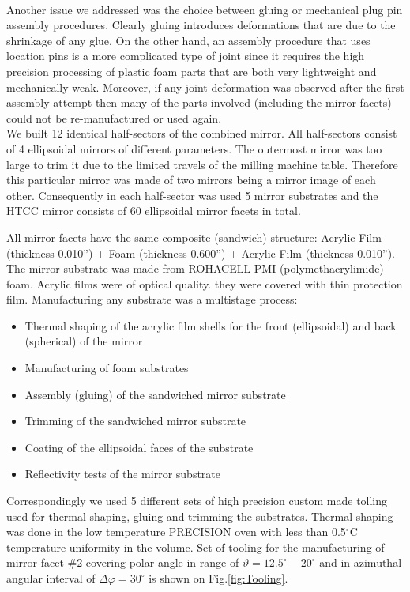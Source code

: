 \\
\indent Another issue we addressed was the choice between gluing or mechanical plug pin assembly procedures. Clearly gluing introduces deformations that are due to the shrinkage of any glue. On the other hand, an assembly procedure that uses location pins is a more complicated type of joint since it requires the high precision processing of plastic foam parts that are both very lightweight and mechanically weak. Moreover, if any joint deformation was observed after the first assembly attempt then many of the parts involved (including the mirror facets) could not be re-manufactured or used again.
\\
\indent We built 12 identical half-sectors of the combined mirror. All half-sectors consist of 4 ellipsoidal mirrors of different parameters. The outermost mirror was too large to trim it due to the limited travels of the milling machine table. Therefore this particular mirror was made of two mirrors being a mirror image of each other. Consequently in each half-sector was used 5 mirror substrates and the HTCC mirror consists of 60 ellipsoidal mirror facets in total. 

\indent All mirror facets have the same composite (sandwich) structure: Acrylic Film (thickness 0.010”) + Foam (thickness 0.600”) + Acrylic Film (thickness 0.010”). The mirror substrate was made from ROHACELL PMI (polymethacrylimide) foam. Acrylic films were of optical quality. they were covered with thin protection film. Manufacturing any substrate was a multistage process:
\begin{itemize}
    \item Thermal shaping of the acrylic film shells for the front (ellipsoidal) and back (spherical) of the mirror
    \item Manufacturing of foam substrates
    \item Assembly (gluing) of the sandwiched mirror substrate
    \item Trimming of the sandwiched mirror substrate
    \item Coating of the ellipsoidal faces of the substrate
    \item Reflectivity tests of the mirror substrate
    \end{itemize}

Correspondingly we used 5 different sets of high precision custom made tolling used for thermal shaping, gluing and trimming
the substrates. Thermal shaping was done in the low temperature PRECISION oven with less than  0.5$^\circ$C  temperature
uniformity in the volume. Set of tooling for the manufacturing of mirror facet \#2 covering polar angle in range of
$\vartheta = 12.5^\circ - 20^\circ$ and in azimuthal angular interval of $\Delta\varphi = 30^\circ$ is shown on Fig.\ref{fig:Tooling}.

